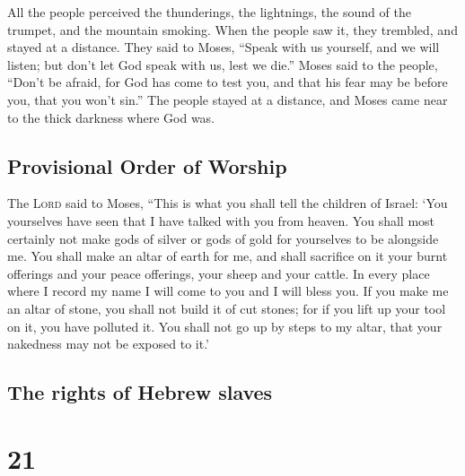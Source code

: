  All the people perceived the thunderings, the
lightnings, the sound of the trumpet, and the mountain smoking. When the
people saw it, they trembled, and stayed at a distance. 
They said to Moses, ``Speak with us yourself, and we will listen; but
don't let God speak with us, lest we die.''  Moses said
to the people, ``Don't be afraid, for God has come to test you, and that
his fear may be before you, that you won't sin.''  The
people stayed at a distance, and Moses came near to the thick darkness
where God was.

\hypertarget{provisional-order-of-worship}{%
\subsection{Provisional Order of
Worship}\label{provisional-order-of-worship}}

 The \textsc{Lord} said to Moses, ``This is what you
shall tell the children of Israel: `You yourselves have seen that I have
talked with you from heaven.  You shall most certainly
not make gods of silver or gods of gold for yourselves to be alongside
me.  You shall make an altar of earth for me, and shall
sacrifice on it your burnt offerings and your peace offerings, your
sheep and your cattle. In every place where I record my name I will come
to you and I will bless you.  If you make me an altar of
stone, you shall not build it of cut stones; for if you lift up your
tool on it, you have polluted it.  You shall not go up by
steps to my altar, that your nakedness may not be exposed to it.'

\hypertarget{the-rights-of-hebrew-slaves}{%
\subsection{The rights of Hebrew
slaves}\label{the-rights-of-hebrew-slaves}}

\hypertarget{section-20}{%
\section{21}\label{section-20}}

